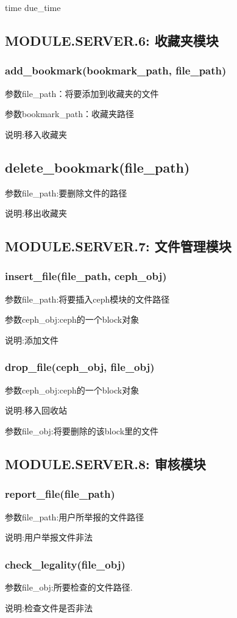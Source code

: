     time due\_time

\subsection{MODULE.SERVER.6: 收藏夹模块}

\subsubsection{add\_bookmark(bookmark\_path, file\_path)}
参数file\_path：将要添加到收藏夹的文件

参数bookmark\_path：收藏夹路径

说明:移入收藏夹
\subsection{delete\_bookmark(file\_path)}
参数file\_path:要删除文件的路径

说明:移出收藏夹
\subsection{MODULE.SERVER.7: 文件管理模块}
\subsubsection{insert\_file(file\_path, ceph\_obj)}
参数file\_path:将要插入ceph模块的文件路径

参数ceph\_obj:ceph的一个block对象

说明:添加文件

\subsubsection{drop\_file(ceph\_obj, file\_obj)}
参数ceph\_obj:ceph的一个block对象

说明:移入回收站

参数file\_obj:将要删除的该block里的文件
\subsection{MODULE.SERVER.8: 审核模块}
\subsubsection{report\_file(file\_path)}
参数file\_path:用户所举报的文件路径

说明:用户举报文件非法

\subsubsection{check\_legality(file\_obj)}
参数file\_obj:所要检查的文件路径.

说明:检查文件是否非法

